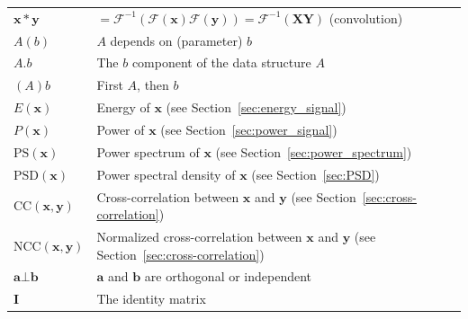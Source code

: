 \begin{tabular}{ll}
  $\bm{x}*\bm{y}$ & $=\mathcal{F}^{-1}(\mathcal{F}(\bm{x})\mathcal{F}(\bm{y}))=\mathcal{F}^{-1}(\mathbf{X}\mathbf{Y})$ (convolution) \\
  $A(b)$ & $A$ depends on (parameter) $b$ \\
  $A.b$ & The $b$ component of the data structure $A$ \\
  $(A)b$ & First $A$, then $b$ \\
  $E(\bm{x})$ & Energy of $\bm{x}$ (see Section~\ref{sec:energy_signal}) \\
  $P(\bm{x})$ & Power of $\bm{x}$ (see Section~\ref{sec:power_signal}) \\
  $\text{PS}(\bm{x})$ & Power spectrum of $\bm{x}$ (see Section~\ref{sec:power_spectrum}) \\
  $\text{PSD}(\bm{x})$ & Power spectral density of $\bm{x}$ (see Section~\ref{sec:PSD}) \\
  $\text{CC}(\bm{x},\bm{y})$ & Cross-correlation between $\bm{x}$ and $\bm{y}$ (see Section~\ref{sec:cross-correlation}) \\
  $\text{NCC}(\bm{x},\bm{y})$ & Normalized cross-correlation between $\bm{x}$ and $\bm{y}$ (see Section~\ref{sec:cross-correlation}) \\
  $\bm{a}\bot \bm{b}$ & $\bm{a}$ and $\bm{b}$ are orthogonal or independent \\
  $\bm{I}$ & The identity matrix
\end{tabular}

